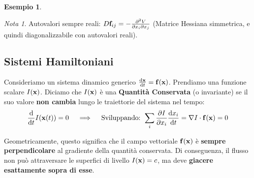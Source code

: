 \documentclass[openany]{book}
\newtheorem*{esempio}{Esempio}
\theoremstyle{definition}
\theoremstyle{remark}
\newtheorem*{nota}{Nota}
\begin{document}
\begin{esempio}
\begin{center}
\end{center}
\end{esempio}

\begin{nota}
Autovalori sempre reali: $D\vb{f}_{ij} = -\pdv{V}{x_i}{x_j}$ (Matrice Hessiana simmetrica, e quindi diagonalizzabile con autovalori reali).
\end{nota}


\subsection{Sistemi Hamiltoniani}

Consideriamo un sistema dinamico generico $\dv{\vb{x}}{t} = \vb{f}(\vb{x})$. Prendiamo una funzione scalare $I(\vb{x})$. Diciamo che $I(\vb{x})$ è una \textbf{Quantità Conservata} (o invariante) se il suo valore \textbf{non cambia} lungo le traiettorie del sistema nel tempo:
\begin{equation}
    \dv{t} I(\vb{x}(t)) = 0 \quad \implies \quad \text{Sviluppando: } \sum_i \pdv{I}{x_i} \dv{x_i}{t} = \nabla I \cdot \vb{f}(\vb{x}) = 0
\end{equation}

\begin{figure}
\vspace{-20pt}
\begin{center}
\end{center}
\vspace{-20pt}
\end{figure}

Geometricamente, questo significa che il campo vettoriale $\vb{f}(\vb{x})$ è \textbf{sempre perpendicolare} al gradiente della quantità conservata. Di conseguenza, il flusso non può attraversare le superfici di livello $I(\vb{x}) = c$, ma deve \textbf{giacere esattamente sopra di esse}.
\end{document}

